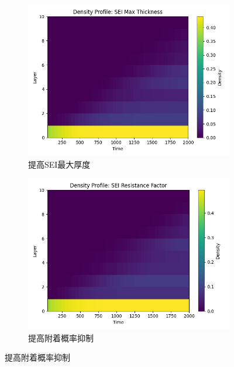 \documentclass{article}
\begin{document}
\begin{figure}[H]
\begin{subfigure}[b]{0.19\textwidth}
      \end{subfigure}
      \hfill
      \begin{subfigure}[b]{0.19\textwidth}
          \centering
          \includegraphics[scale=0.2]{figs/parallel_density_profile_sei_max_thickness.png}
          \caption{提高SEI最大厚度}
   
      \end{subfigure}
      \hfill
      \begin{subfigure}[b]{0.19\textwidth}
          \centering
          \includegraphics[scale=0.2]{figs/parallel_density_profile_sei_resistance_factor.png}
          \caption{提高附着概率抑制}
         

\end{subfigure}
\end{figure}
\end{document}
